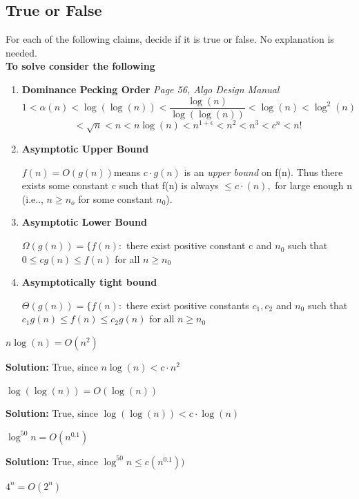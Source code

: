 \documentclass[11pt,fleqn]{book}
\begin{document}
\subsection{True or False}
For each of the following claims, decide if it is true or false. No explanation is needed.\\
\textbf{To solve consider the following}
\begin{enumerate}
    \item \textbf{Dominance Pecking Order} \textit{Page 56, Algo Design Manual}
    $$1 < \alpha(n) < \log(\log(n)) < \frac{\log(n)}{\log(\log(n))} <  \log(n) <  \log^2(n) $$
    $$< \sqrt{n} < n < n\log(n) < n^{1 + \epsilon}  < n^2 < n^3 < c^n < n!$$
    \item \textbf{Asymptotic Upper Bound} 
    \begin{definition}
    $f(n) = O(g(n))$means $c\cdot g(n)$ is an \textit{upper bound} on f(n). Thus there exists some
    constant c such that f(n) is always $\leq c\cdot(n),$ for large enough n (i.e.., $n\geq n_o$ for some constant $n_0$).
    \end{definition}
    \item \textbf{Asymptotic Lower Bound}
    \begin{definition}
        $\Omega(g(n)) = \{f(n): $ there exist positive constant c and $n_0$ such that \\
        $0 \leq cg(n) \leq f(n)$ for all $n \geq n_0$
    \end{definition}
    \item \textbf{Asymptotically tight bound } 
    \begin{definition}
        $\Theta(g(n)) = \{ f(n) : $ there exist positive constants $c_1, c_2$ and $n_0$ such that\\ $c_1g(n) \leq f(n) \leq c_2g(n)$ for all $n \geq n_0$
    \end{definition}
\end{enumerate}
\begin{example}
$n\log(n) = O(n^2)$
\end{example}
\textbf{Solution:} True, since $n\log(n) < c\cdot n^2$
\begin{example}
$\log(\log(n)) = O(\log(n))$
\end{example}
\textbf{Solution:} True, since $\log(\log(n)) < c\cdot \log(n)$
\begin{example}
$\log^{50}n = O(n^{0.1})$
\end{example}
\textbf{Solution:} True, since $\log^{50}n \leq c(n^{0.1}))$
\begin{example}
$4^n = O(2^n)$
\end{example}
\end{document}
